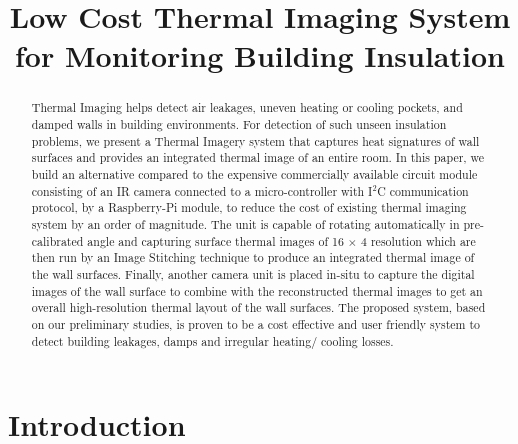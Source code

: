 \documentclass{sig-alternate}
\begin{document}
 

\title{Low Cost Thermal Imaging System for Monitoring Building Insulation}

\maketitle

\begin{abstract}
   Thermal Imaging helps detect air leakages, uneven heating or cooling pockets, and damped walls in building environments. For detection of such unseen insulation problems, we present a Thermal Imagery system that captures heat signatures of wall surfaces and provides an integrated thermal image of an entire room. In this paper, we build an alternative compared to the expensive commercially available circuit module consisting of an IR camera connected to a micro-controller with I$^2$C communication protocol, by a Raspberry-Pi module, to reduce the cost of existing thermal imaging system by an order of magnitude. The unit is capable of rotating automatically in pre-calibrated angle and capturing surface thermal images of 16 $\times$ 4 resolution which are then run by an Image Stitching technique to produce an integrated thermal image of the wall surfaces. Finally, another camera unit is placed in-situ to capture the digital images of the wall surface to combine with the reconstructed thermal images to get an overall high-resolution thermal layout of the wall surfaces. The proposed system, based on our preliminary studies, is proven to be a cost effective and user friendly system to detect building leakages, damps and irregular heating/ cooling losses.
\end{abstract}

\section{Introduction} 
\end{document}
